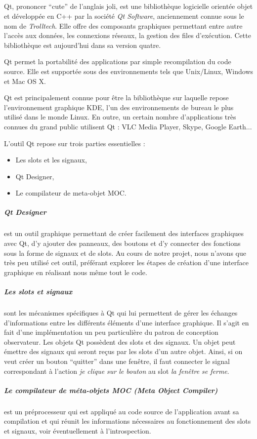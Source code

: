\subparagraph{}
Qt, prononcer ``cute'' de l'anglais joli, est une biblioth\`eque logicielle orient\'ee objet et d\'evelopp\'ee en C++ par la soci\'et\'e \textit{Qt Software}, anciennement connue sous le nom de \textit{Trolltech}. Elle offre des composants graphiques permettant entre autre l'acc\`es aux donn\'ees, les connexions r\'eseaux, la gestion des files d'ex\'ecution. Cette biblioth\`eque est aujourd'hui dans sa version quatre.

Qt permet la portabilit\'e des applications par simple recompilation du code source. Elle est support\'ee sous des environnements tels que Unix/Linux, Windows et Mac OS X.

Qt est principalement connue pour \^etre la biblioth\`eque sur laquelle repose l'environnement graphique KDE, l'un des environnements de bureau le plus utilis\'e dans le monde Linux. En outre, un certain nombre d'applications tr\`es connues du grand public utilisent Qt : VLC Media Player, Skype, Google Earth...

\par
L'outil Qt repose sur trois parties essentielles : 
\begin{itemize}
	\item Les slots et les signaux,
	\item Qt Designer,
	\item Le compilateur de meta-objet MOC.
\end{itemize}

\subparagraph{Qt Designer} est un outil graphique permettant de créer facilement des interfaces graphiques avec Qt, d'y ajouter des panneaux, des boutons et d'y connecter des fonctions sous la forme de signaux et de slots. Au cours de notre projet, nous n'avons que tr\`es peu utilis\'e cet outil, pr\'ef\'erant explorer les \'etapes de cr\'eation d'une interface graphique en r\'ealisant nous m\^eme tout le code.
\subparagraph{Les slots et signaux} sont les m\'ecanismes sp\'ecifiques \`a Qt qui lui permettent de g\'erer les \'echanges d'informations entre les diff\'erents \'el\'ements d'une interface graphique. Il s'agit en fait d'une impl\'ementation un peu particulière du patron de conception observateur.
Les objets Qt poss\`edent des slots et des signaux. Un objet peut \'emettre des signaux qui seront re\c cus par les slots d'un autre objet. Ainsi, si on veut cr\'eer un bouton ``quitter'' dans une fen\^etre, il faut connecter le signal correspondant à l'action \textit{je clique sur le bouton} au slot \textit{la fen\^etre se ferme}.
\subparagraph{Le compilateur de m\'eta-objets MOC (Meta Object Compiler)} est un pr\'eprocesseur qui est appliqu\'e au code source de l'application avant sa compilation et qui r\'eunit les informations n\'ecessaires au fonctionnement des slots et signaux, voir \'eventuellement \`a l'introspection.

